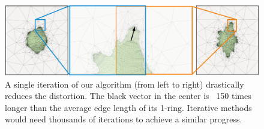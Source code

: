 \begin{figure}[t]
\includegraphics[width=\columnwidth]{figs/camel_step.pdf}
\caption{A single iteration of our algorithm (from left to right) drastically reduces the distortion. The black vector in the center is ~150 times longer than the average edge length of its 1-ring. Iterative methods would need thousands of iterations to achieve a similar progress.}
\vspace{-0.3cm}
\label{scaf:fig:largestep}
\end{figure}

